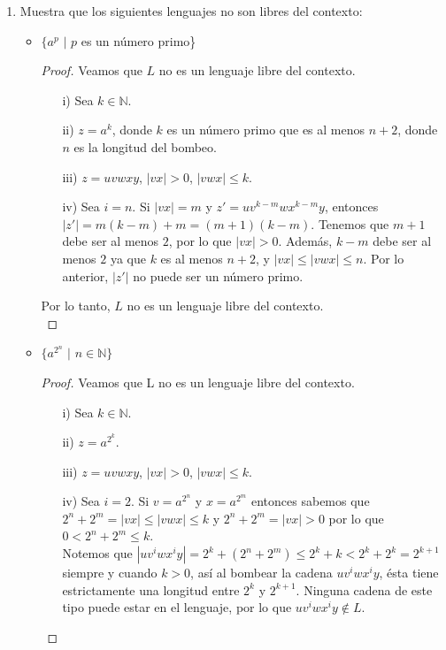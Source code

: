 \documentclass[letterpaper,11pt]{article}
\begin{document}
\begin{enumerate}
       \item Muestra que los siguientes lenguajes no son libres del contexto:
       \begin{itemize}
           \item $\{a^{p}$ $|$ $p$ es un número primo\}
           \begin{proof} Veamos que $L$ no es un lenguaje libre del contexto.
               \begin{itemize}
                   \item[i)] Sea $k \in \mathbb{N}$.
                   \item[ii)] $z = a^{k}$, donde $k$ es un número primo que
                   es al menos $n + 2$, donde $n$ es la longitud del bombeo.
                   \item[iii)] $z = uvwxy$, $|vx| > 0$, $|vwx| \leq k$.
                   \item[iv)] Sea $i = n$. Si $|vx| = m$ y 
                   $z' = uv^{k-m}wx^{k-m}y$, entonces 
                   $|z'| = m(k-m) + m = (m + 1)(k - m)$. Tenemos que $m+1$
                   debe ser al menos $2$, por lo que $|vx| > 0$. Además,
                   $k - m$ debe ser al menos $2$ ya que $k$ es al menos
                   $n + 2$, y $|vx| \leq |vwx| \leq n$. Por lo anterior,
                   $|z'|$ no puede ser un número primo.


               \end{itemize}
               Por lo tanto, $L$ no es un lenguaje libre del contexto. \\
           \end{proof}
           
           \item $\{a^{2^{n}}$ $|$ $n \in \mathbb{N}\}$
           \begin{proof} Veamos que L no es un lenguaje libre del contexto.
               \begin{itemize}
                   \item[i)] Sea $k \in \mathbb{N}$.
                   \item[ii)] $z = a^{2^{k}}$.
                   \item[iii)] $z = uvwxy$, $|vx| > 0$, $|vwx| \leq k$.
                   \item[iv)] Sea $i = 2$. Si $v = a^{2^{n}}$ y
                   $x = a^{2^{m}}$ entonces sabemos que
                   $2^{n} + 2^{m} = |vx| \leq |vwx| \leq k$ y 
                   $2^{n} + 2^{m} = |vx| > 0$ por lo que 
                   $0 < 2^{n} + 2^{m} \leq k$. \\
                   Notemos que $|uv^{i}wx^{i}y| = 2^{k} + (2^{n} + 2^{m})
                   \leq 2^{k} + k < 2^{k} + 2^{k} = 2^{k+1}$ siempre y 
                   cuando $k > 0$, así al bombear la cadena $uv^{i}wx^{i}y$,
                   ésta tiene estrictamente una longitud entre $2^{k}$ y
                   $2^{k+1}$. Ninguna cadena de este tipo puede estar en 
                   el lenguaje, por lo que $uv^{i}wx^{i}y \notin L$.
                   

\end{itemize}
\end{proof}
\end{itemize}
\end{enumerate}
\end{document}
